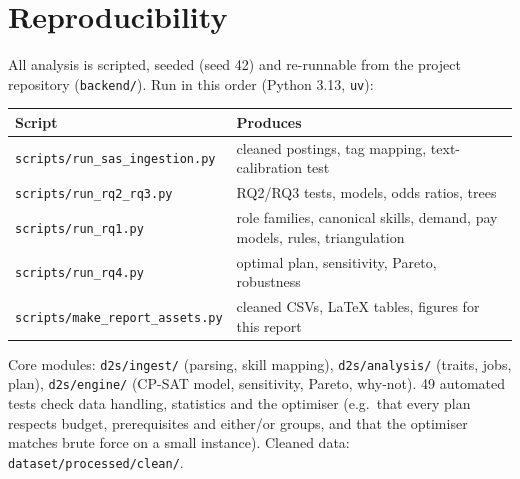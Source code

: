 \section{Reproducibility}\label{app:repro}

All analysis is scripted, seeded (seed 42) and re-runnable from the project repository
(\texttt{backend/}). Run in this order (Python 3.13, \texttt{uv}):

\begin{table}[H]\centering\small
\begin{tabularx}{\linewidth}{@{}L{5.6cm}Y@{}}
\toprule
Script & Produces\\
\midrule
\texttt{scripts/run\_sas\_ingestion.py} & cleaned postings, tag mapping, text-calibration test\\
\texttt{scripts/run\_rq2\_rq3.py} & RQ2/RQ3 tests, models, odds ratios, trees\\
\texttt{scripts/run\_rq1.py} & role families, canonical skills, demand, pay models, rules, triangulation\\
\texttt{scripts/run\_rq4.py} & optimal plan, sensitivity, Pareto, robustness\\
\texttt{scripts/make\_report\_assets.py} & cleaned CSVs, LaTeX tables, figures for this report\\
\bottomrule
\end{tabularx}
\end{table}

{\sloppy Core modules: \texttt{d2s/ingest/} (parsing, skill mapping), \texttt{d2s/analysis/} (traits, jobs,
plan), \texttt{d2s/engine/} (CP-SAT model, sensitivity, Pareto, why-not). 49 automated tests check
data handling, statistics and the optimiser (e.g.\ that every plan respects budget, prerequisites
and either/or groups, and that the optimiser matches brute force on a small instance). Cleaned data:
\texttt{dataset/processed/clean/}.\par}

